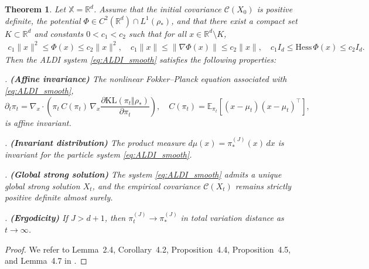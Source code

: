 \documentclass[a4paper]{article}
\numberwithin{equation}{section}
\newtheorem{theorem}{Theorem}[section]
\begin{document}
\begin{theorem}
\label{THM:ALDI_properties}
Let $\mathbb X=\mathbb{R}^d$. Assume that the initial covariance \(\mathcal{C}(X_0)\) is positive definite, the potential \(\Phi \in C^2(\mathbb{R}^d)\cap L^1(\rho_*)\), and that there exist a compact set \(K \subset \mathbb{R}^d\) and constants \(0 < c_1 < c_2\) such that for all \(x \in \mathbb{R}^d \setminus K\),
\begin{equation}
    \label{eq:conditions_potential}
    \begin{split}
        c_1 \|x\|^2 \le \Phi(x) \le c_2 \|x\|^2, \quad
        c_1 \|x\| \le \|\nabla \Phi(x)\| \le c_2 \|x\|, \quad
        c_1 I_d \le \mathrm{Hess}\,\Phi(x) \le c_2 I_d.
    \end{split}
\end{equation}
Then the ALDI system \eqref{eq:ALDI_smooth} satisfies the following properties:

\smallskip
{}. \textbf{(Affine invariance)}  
The nonlinear Fokker–Planck equation associated with \eqref{eq:ALDI_smooth},
\begin{equation}
\label{eq:Fokker_Planck_nonlinear}
\partial_t\pi_t = 
\nabla_x \!\cdot\!
\left(
\pi_t\,C(\pi_t)\,\nabla_x
\frac{\partial \mathrm{KL}(\pi_t\Vert \rho_*)}{\partial \pi_t}
\right),
\quad
C(\pi_t) = \mathbb{E}_{\pi_t}\!\left[(x-\mu_t)(x-\mu_t)^\top\right],
\end{equation}
is affine invariant.

\smallskip
{}. \textbf{(Invariant distribution)}  
The product measure \(d\mu(x)=\pi_*^{(J)}(x)\,dx\) is invariant for the particle system \eqref{eq:ALDI_smooth}.

\smallskip
{}. \textbf{(Global strong solution)}  
The system \eqref{eq:ALDI_smooth} admits a unique global strong solution \(X_t\), and the empirical covariance \(\mathcal{C}(X_t)\) remains strictly positive definite almost surely.

\smallskip
{}. \textbf{(Ergodicity)}  
If \(J > d+1\), then \(\pi_t^{(J)} \to \pi_*^{(J)}\) in total variation distance as \(t \to \infty\).

\end{theorem}

\begin{proof}
We refer to Lemma~2.4, Corollary~4.2, Proposition~4.4, Proposition~4.5, and Lemma~4.7 in \cite{Nusken20}.
\end{proof}
\end{document}
